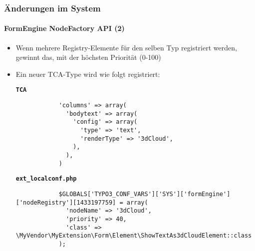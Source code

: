 \begin{frame}[fragile]
	\frametitle{Änderungen im System}
	\framesubtitle{FormEngine NodeFactory API (2)}

	\lstset{basicstyle=\tiny\ttfamily}

	\begin{itemize}

		\item Wenn mehrere Registry-Elemente für den selben Typ registriert
			werden, gewinnt das, mit der höchsten Priorität (0-100)

		\item Ein neuer TCA-Type wird wie folgt registriert:

		\smaller\textbf{\texttt{TCA}}
		\begin{lstlisting}
			'columns' => array(
			  'bodytext' => array(
			    'config' => array(
			      'type' => 'text',
			      'renderType' => '3dCloud',
			    ),
			  ),
			)
		\end{lstlisting}

		\smaller\textbf{\texttt{ext\_localconf.php}}
		\begin{lstlisting}
			$GLOBALS['TYPO3_CONF_VARS']['SYS']['formEngine']['nodeRegistry'][1433197759] = array(
			  'nodeName' => '3dCloud',
			  'priority' => 40,
			  'class' => \MyVendor\MyExtension\Form\Element\ShowTextAs3dCloudElement::class
			);
		\end{lstlisting}

	\end{itemize}

\end{frame}


